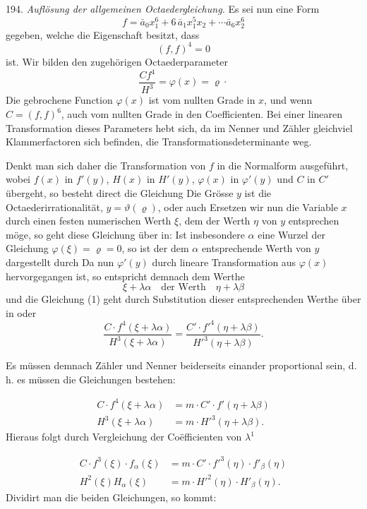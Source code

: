 194. \textit{Auflösung der allgemeinen Octaedergleichung.} Es sei nun eine Form
\[
f=\bar a_0x_1^{6}+6\,\bar a_1x_1^{5}x_2+\cdots \bar a_6x_2^{6}
\]
gegeben, welche die Eigenschaft besitzt, dass
\[
(f,f)^4=0
\]
ist. Wir bilden den zugehörigen Octaederparameter
\[
\frac{Cf^4}{H^3}=\varphi(x)=\varrho\cdot
\]
Die gebrochene Function $\varphi(x)$ ist vom nullten Grade in $x$, und wenn $C=(f,f)^6$, auch vom nullten Grade in den Coefficienten. Bei einer linearen Transformation dieses Parameters hebt sich, da im Nenner und Zähler gleichviel Klammerfactoren sich befinden, die Transformationsdeterminante weg.

Denkt man sich daher die Transformation von $f$ in die Normalform ausgeführt, wobei $f(x)$ in $f'(y)$, $H(x)$ in $H'(y)$, $\varphi(x)$ in $\varphi'(y)$ und $C$ in $C'$ übergeht, so besteht direct die Gleichung
Die Grösse $y$ ist die Octaederirrationalität, $y=\vartheta(\varrho)$, oder auch
Ersetzen wir nun die Variable $x$ durch einen festen numerischen Werth $\xi$, dem der Werth $\eta$ von $y$ entsprechen möge, so geht diese Gleichung über in:
Ist insbesondere $\alpha$ eine Wurzel der Gleichung $\varphi(\xi)=\varrho=0$, so ist der dem $\alpha$ entsprechende Werth von $y$ dargestellt durch
Da nun $\varphi'(y)$ durch lineare Transformation aus $\varphi(x)$ hervorgegangen ist, so entspricht demnach dem Werthe
\[
\xi+\lambda\alpha \quad \text{der Werth} \quad \eta+\lambda\beta
\]
und die Gleichung (1) geht durch Substitution dieser entsprechenden Werthe über in
oder
\[
\frac{C\cdot f^4(\xi+\lambda\alpha)}{H^3(\xi+\lambda\alpha)}=\frac{C'\cdot f'^4(\eta+\lambda\beta)}{H'^3(\eta+\lambda\beta)}.
\]



Es müssen demnach Zähler und Nenner beiderseits einander proportional sein, d.\,h. es müssen die Gleichungen bestehen:

\[
\begin{aligned}
C\cdot f^4(\xi+\lambda\alpha) &= m\cdot C'\cdot f'(\eta+\lambda\beta)\\
H^3(\xi+\lambda\alpha) &= m\cdot H'^3(\eta+\lambda\beta).
\end{aligned}
\]
Hieraus folgt durch Vergleichung der Co\"efficienten von $\lambda^1$

\[
\begin{aligned}
C\cdot f^3(\xi)\cdot f_\alpha(\xi) &= m\cdot C'\cdot f'^3(\eta)\cdot f'_\beta(\eta)\\
H^2(\xi)H_\alpha(\xi) &= m\cdot H'^2(\eta)\cdot H'_\beta(\eta).
\end{aligned}
\]
Dividirt man die beiden Gleichungen, so kommt:


